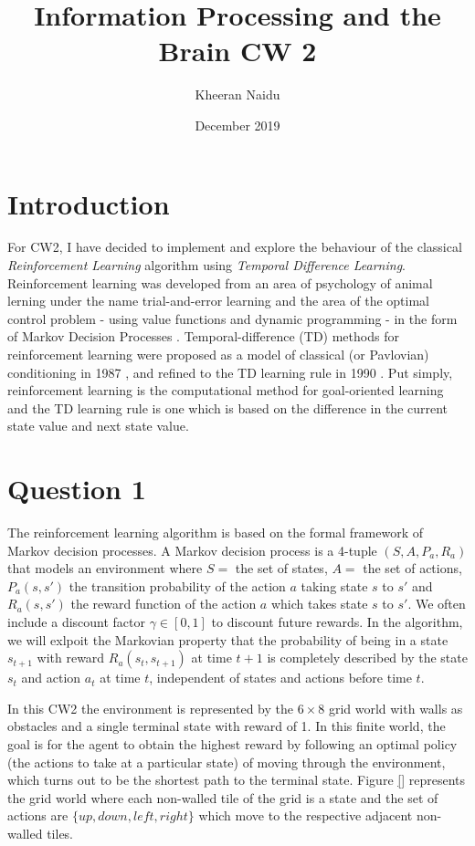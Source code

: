 \documentclass[10pt, a4paper]{article}
\title{Information Processing and the Brain CW 2}
\author{Kheeran Naidu}
\date{December 2019}
\begin{document}
\maketitle

\section*{Introduction}
For CW2, I have decided to implement and explore the behaviour of the classical \textit{Reinforcement Learning} algorithm using \textit{Temporal Difference Learning}. Reinforcement learning was developed from an area of psychology of animal lerning under the name trial-and-error learning \cite{woodworth1937experimental} and the area of the optimal control problem - using value functions and dynamic programming - in the form of Markov Decision Processes \cite{bellman1957markov}\cite{bellman1957dynamic}. Temporal-difference (TD) methods for reinforcement learning were proposed as a model of classical (or Pavlovian) conditioning in 1987 \cite{sutton1987temporal}, and refined to the TD learning rule in 1990 \cite{sutton1990time}. Put simply, reinforcement learning is the computational method for goal-oriented learning and the TD learning rule is one which is based on the difference in the current state value and next state value.

\section*{Question 1}
The reinforcement learning algorithm is based on the formal framework of Markov decision processes. A Markov decision process is a 4-tuple $(S,A,P_a, R_a)$ that models an environment where $S =$ the set of states, $A =$ the set of actions, $P_a(s,s')$ the transition probability of the action $a$ taking state $s$ to $s'$ and $R_a(s,s')$ the reward function of the action $a$ which takes state $s$ to $s'$. We often include a discount factor $\gamma \in [0,1]$ to discount future rewards. In the algorithm, we will exlpoit the Markovian property that the probability of being in a state $s_{t+1}$ with reward $R_a(s_t, s_{t+1})$ at time $t+1$ is completely described by the state $s_t$ and action $a_t$ at time $t$, independent of states and actions before time $t$.

In this CW2 the environment is represented by the $6 \times 8$ grid world with walls as obstacles and a single terminal state with reward of 1. In this finite world, the goal is for the agent to obtain the highest reward by following an optimal policy (the actions to take at a particular state) of moving through the environment, which turns out to be the shortest path to the terminal state. Figure \ref{} represents the grid world where each non-walled tile of the grid is a state and the set of actions are $\{up, down, left, right\}$ which move to the respective adjacent non-walled tiles.





\newpage

\printbibliography
\end{document}
